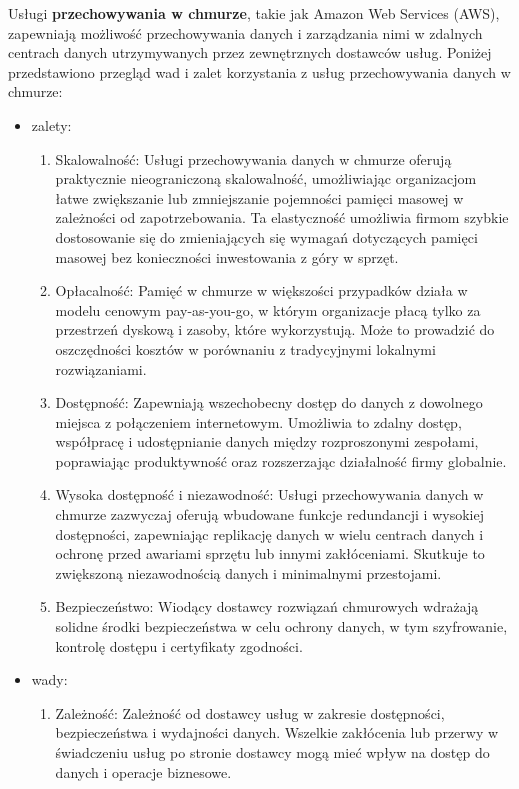 \documentclass[12pt,a4paper,twoside]{article}
\begin{document}
Usługi \textbf{przechowywania w chmurze}, takie jak Amazon Web Services (AWS), zapewniają możliwość przechowywania danych i zarządzania nimi w zdalnych centrach danych utrzymywanych przez zewnętrznych dostawców usług. Poniżej przedstawiono przegląd wad i zalet korzystania z usług przechowywania danych w chmurze:
\begin{itemize}
	\item zalety:
		\begin{enumerate}
			\item Skalowalność: Usługi przechowywania danych w chmurze oferują praktycznie nieograniczoną skalowalność, umożliwiając organizacjom łatwe zwiększanie lub zmniejszanie pojemności pamięci masowej w zależności od zapotrzebowania. Ta elastyczność umożliwia firmom szybkie dostosowanie się do zmieniających się wymagań dotyczących pamięci masowej bez konieczności inwestowania z góry w sprzęt.
			\item Opłacalność: Pamięć w chmurze w większości przypadków działa w modelu cenowym pay-as-you-go, w którym organizacje płacą tylko za przestrzeń dyskową i zasoby, które wykorzystują. Może to prowadzić do oszczędności kosztów w porównaniu z tradycyjnymi lokalnymi rozwiązaniami.
			\item Dostępność: Zapewniają wszechobecny dostęp do danych z dowolnego miejsca z połączeniem internetowym. Umożliwia to zdalny dostęp, współpracę i udostępnianie danych między rozproszonymi zespołami, poprawiając produktywność oraz rozszerzając działalność firmy globalnie.
			\item Wysoka dostępność i niezawodność: Usługi przechowywania danych w chmurze zazwyczaj oferują wbudowane funkcje redundancji i wysokiej dostępności, zapewniając replikację danych w wielu centrach danych i ochronę przed awariami sprzętu lub innymi zakłóceniami. Skutkuje to zwiększoną niezawodnością danych i minimalnymi przestojami.
			\item Bezpieczeństwo: Wiodący dostawcy rozwiązań chmurowych wdrażają solidne środki bezpieczeństwa w celu ochrony danych, w tym szyfrowanie, kontrolę dostępu i certyfikaty zgodności.
		\end{enumerate}
	\item wady:
		\begin{enumerate}
			\item Zależność: Zależność od dostawcy usług w zakresie dostępności, bezpieczeństwa i wydajności danych. Wszelkie zakłócenia lub przerwy w świadczeniu usług po stronie dostawcy mogą mieć wpływ na dostęp do danych i operacje biznesowe.

\end{enumerate}
\end{itemize}
\end{document}
